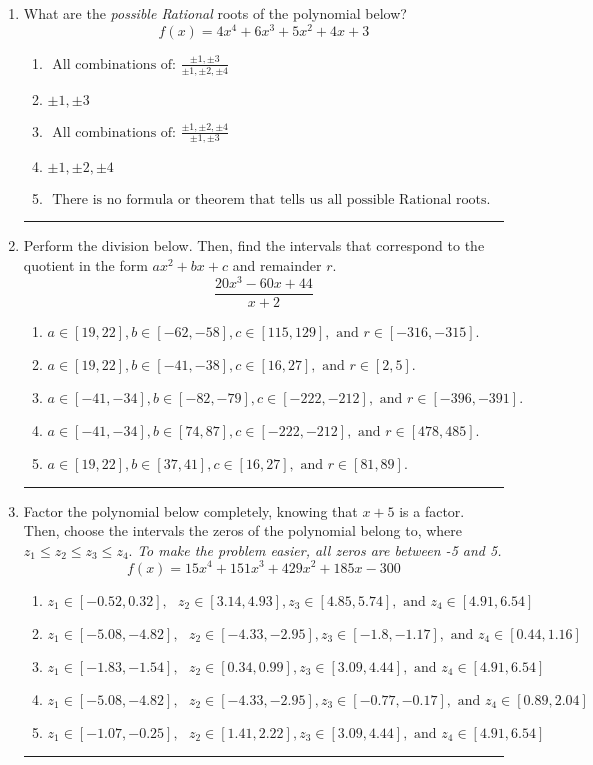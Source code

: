 \documentclass[14pt]{extbook}
\newcommand{\litem}[1]{\item#1\hspace*{-1cm}\rule{\textwidth}{0.4pt}}
\begin{document}
\begin{enumerate}
\litem{
What are the \textit{possible Rational} roots of the polynomial below?\[ f(x) = 4x^{4} +6 x^{3} +5 x^{2} +4 x + 3 \]\begin{enumerate}[label=\Alph*.]
\item \( \text{ All combinations of: }\frac{\pm 1,\pm 3}{\pm 1,\pm 2,\pm 4} \)
\item \( \pm 1,\pm 3 \)
\item \( \text{ All combinations of: }\frac{\pm 1,\pm 2,\pm 4}{\pm 1,\pm 3} \)
\item \( \pm 1,\pm 2,\pm 4 \)
\item \( \text{ There is no formula or theorem that tells us all possible Rational roots.} \)

\end{enumerate} }
\litem{
Perform the division below. Then, find the intervals that correspond to the quotient in the form $ax^2+bx+c$ and remainder $r$.\[ \frac{20x^{3} -60 x + 44}{x + 2} \]\begin{enumerate}[label=\Alph*.]
\item \( a \in [19, 22], b \in [-62, -58], c \in [115, 129], \text{ and } r \in [-316, -315]. \)
\item \( a \in [19, 22], b \in [-41, -38], c \in [16, 27], \text{ and } r \in [2, 5]. \)
\item \( a \in [-41, -34], b \in [-82, -79], c \in [-222, -212], \text{ and } r \in [-396, -391]. \)
\item \( a \in [-41, -34], b \in [74, 87], c \in [-222, -212], \text{ and } r \in [478, 485]. \)
\item \( a \in [19, 22], b \in [37, 41], c \in [16, 27], \text{ and } r \in [81, 89]. \)

\end{enumerate} }
\litem{
Factor the polynomial below completely, knowing that $x + 5$ is a factor. Then, choose the intervals the zeros of the polynomial belong to, where $z_1 \leq z_2 \leq z_3 \leq z_4$. \textit{To make the problem easier, all zeros are between -5 and 5.}\[ f(x) = 15x^{4} +151 x^{3} +429 x^{2} +185 x -300 \]\begin{enumerate}[label=\Alph*.]
\item \( z_1 \in [-0.52, 0.32], \text{   }  z_2 \in [3.14, 4.93], z_3 \in [4.85, 5.74], \text{   and   } z_4 \in [4.91, 6.54] \)
\item \( z_1 \in [-5.08, -4.82], \text{   }  z_2 \in [-4.33, -2.95], z_3 \in [-1.8, -1.17], \text{   and   } z_4 \in [0.44, 1.16] \)
\item \( z_1 \in [-1.83, -1.54], \text{   }  z_2 \in [0.34, 0.99], z_3 \in [3.09, 4.44], \text{   and   } z_4 \in [4.91, 6.54] \)
\item \( z_1 \in [-5.08, -4.82], \text{   }  z_2 \in [-4.33, -2.95], z_3 \in [-0.77, -0.17], \text{   and   } z_4 \in [0.89, 2.04] \)
\item \( z_1 \in [-1.07, -0.25], \text{   }  z_2 \in [1.41, 2.22], z_3 \in [3.09, 4.44], \text{   and   } z_4 \in [4.91, 6.54] \)


\end{enumerate}}
\end{enumerate}
\end{document}
